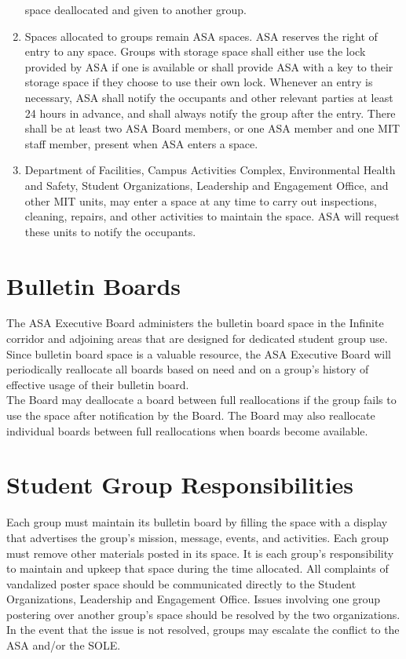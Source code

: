 \documentclass[12pt]{article}
\begin{document}
\begin{enumerate}
space deallocated and given to another group.
    \item Spaces allocated to groups remain ASA spaces. ASA reserves the right of entry to any
space. Groups with storage space shall either use the lock provided by ASA if one is
available or shall provide ASA with a key to their storage space if they choose to use
their own lock. Whenever an entry is necessary, ASA shall notify the occupants and
other relevant parties at least 24 hours in advance, and shall always notify the group
after the entry. There shall be at least two ASA Board members, or one ASA member and
one MIT staff member, present when ASA enters a space.
    \item Department of Facilities, Campus Activities Complex, Environmental Health and Safety,
Student Organizations, Leadership and Engagement Office, and other MIT units, may
enter a space at any time to carry out inspections, cleaning, repairs, and other activities
to maintain the space. ASA will request these units to notify the occupants.
\end{enumerate}

\newpage

\label{art:VIII}


\section{Bulletin Boards}
The ASA Executive Board administers the bulletin board space in the Infinite corridor and adjoining
areas that are designed for dedicated student group use. Since bulletin board space is a valuable
resource, the ASA Executive Board will periodically reallocate all boards based on need and on a
group’s history of effective usage of their bulletin board.
\\

The Board may deallocate a board between full reallocations if the group fails to use the space after
notification by the Board. The Board may also reallocate individual boards between full reallocations
when boards become available.

\section{Student Group Responsibilities}
Each group must maintain its bulletin board by filling the space with a display that advertises the
group’s mission, message, events, and activities. Each group must remove other materials posted in its
space. It is each group’s responsibility to maintain and upkeep that space during the time allocated. All
complaints of vandalized poster space should be communicated directly to the Student Organizations,
Leadership and Engagement Office. Issues involving one group postering over another group’s space
should be resolved by the two organizations. In the event that the issue is not resolved, groups may
escalate the conflict to the ASA and/or the SOLE.
\\
\end{document}
